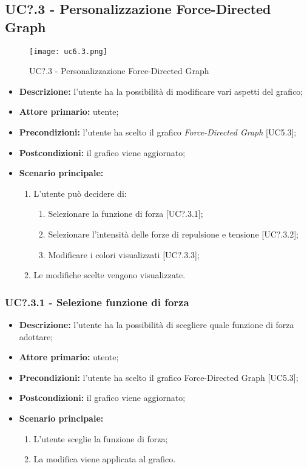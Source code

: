 \subsection{UC?.3 - Personalizzazione Force-Directed Graph}
\begin{figure}[H]
  \centering
  \texttt{[image: uc6.3.png]}
  \caption{UC?.3 - Personalizzazione Force-Directed Graph}
\end{figure}
\begin{itemize}
    \item \textbf{Descrizione:} l'utente ha la possibilità di modificare vari aspetti del grafico;
    \item \textbf{Attore primario:} utente;
    \item \textbf{Precondizioni:} l’utente ha scelto il grafico \textit{Force-Directed Graph} [UC5.3];
    \item \textbf{Postcondizioni:} il grafico viene aggiornato;
    \item \textbf{Scenario principale:}
    \begin{enumerate}
      \item L'utente può decidere di:
    \begin{enumerate}
      \item Selezionare la funzione di forza [UC?.3.1];
      \item Selezionare l'intensità delle forze di repulsione e tensione [UC?.3.2];
      \item Modificare i colori visualizzati [UC?.3.3];
    \end{enumerate}
    \item Le modifiche scelte vengono visualizzate.
  \end{enumerate}
  \end{itemize}

  \subsubsection{UC?.3.1 - Selezione funzione di forza}
  \begin{itemize}
    \item \textbf{Descrizione:} l'utente ha la possibilità di scegliere quale funzione di forza adottare;
    \item \textbf{Attore primario:} utente;
    \item \textbf{Precondizioni:} l’utente ha scelto il grafico Force-Directed Graph [UC5.3];
    \item \textbf{Postcondizioni:} il grafico viene aggiornato;
    \item \textbf{Scenario principale:}
     \begin{enumerate}
      \item L'utente sceglie la funzione di forza;
      \item La modifica viene applicata al grafico.
    \end{enumerate}
  \end{itemize}

